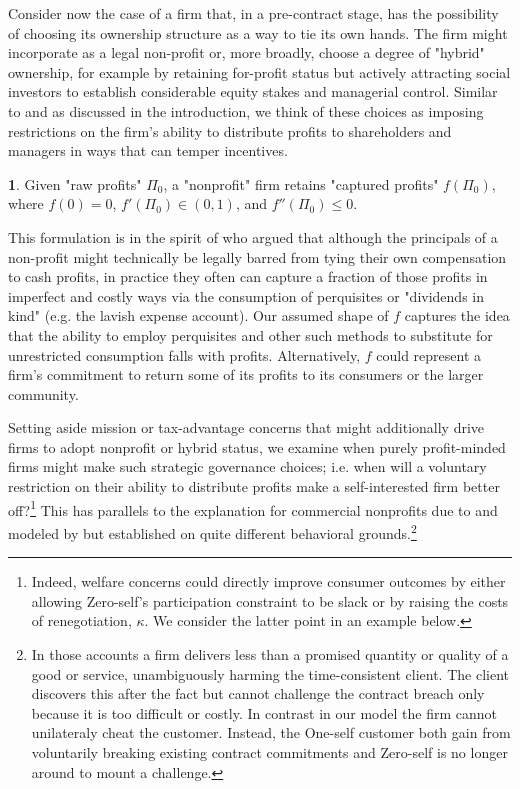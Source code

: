 \documentclass[11pt,english]{article}
\theoremstyle{plain}
\theoremstyle{definition}
\newtheorem*{defn*}{\protect\definitionname}
\providecommand{\definitionname}{Definition}
\begin{document}
Consider now the case of a firm that, in a pre-contract stage, has
the possibility of choosing its ownership structure as a way to tie its own hands. The firm might incorporate
as a legal non-profit or, more broadly, choose a degree of "hybrid"
ownership, for example by retaining for-profit status but actively attracting
social investors to establish considerable equity stakes and managerial
control. Similar to \citet{hansmann1996a} and as discussed
in the introduction, we think of these choices as imposing  restrictions on the firm's
ability to distribute profits to shareholders and managers in ways that can temper incentives. 
\begin{defn*}
Given "raw profits" $\Pi_{0}$, a "nonprofit" firm retains "captured
profits" $f\left(\Pi_{0}\right)$, where $f\left(0\right)=0$, $f'\left(\Pi_{0}\right)\in\left(0,1\right)$,
and $f''\left(\Pi_{0}\right)\leq0.$ 
\end{defn*}
This formulation is in the spirit of \citet{glaeser2001} who argued that although
the principals of a non-profit might technically be legally barred from
tying their own compensation to cash profits, in practice they often can capture a
fraction of those profits in imperfect and costly ways via the consumption
of perquisites or "dividends in kind" (e.g. the lavish expense account).
Our assumed shape of \(f\) captures the idea that the ability to employ perquisites and other such methods to substitute for unrestricted consumption
falls with profits. Alternatively, \(f\) could represent a firm's commitment to return some of its profits to its consumers or the larger community.

Setting aside mission or tax-advantage concerns that might additionally drive firms to adopt nonprofit
or hybrid status, we examine when purely profit-minded firms might
make such strategic governance choices; i.e. when will a voluntary restriction
on their ability to distribute profits make a self-interested firm better
off?\footnote{Indeed, welfare concerns could directly improve consumer outcomes
by either allowing Zero-self's participation constraint to be slack
or by raising the costs of renegotiation, $\kappa$. We consider the
latter point in an example below.} This has parallels to the explanation for commercial nonprofits due
to \citet{hansmann1996a} and modeled by \citet{glaeser2001} but
established on quite different behavioral grounds.\footnote{In those  accounts a firm delivers less than a promised quantity or
quality of a good or service, unambiguously harming the time-consistent
client. The client discovers this after the fact but cannot challenge
the contract breach only because it is too difficult or costly. In
contrast in our model the firm cannot unilateraly cheat the customer. Instead, the One-self customer both gain
from voluntarily breaking existing contract commitments and Zero-self
is no longer around to mount a challenge.}
\end{document}
